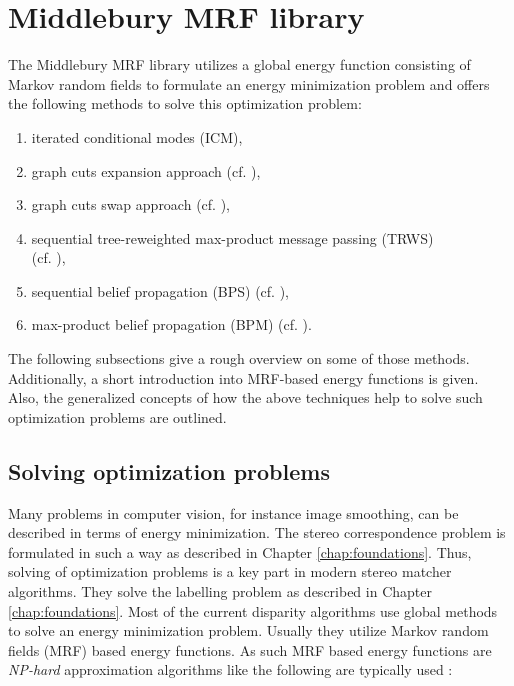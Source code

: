 \section{Middlebury MRF library}

The Middlebury MRF library \citep{scharstein2014high, szeliski2008comparative} utilizes a global energy function consisting of Markov random fields to formulate an energy minimization problem and offers the following methods to solve this optimization problem:

\begin{enumerate}
  \item iterated conditional modes (ICM),
  \item graph cuts expansion approach (cf. \citep{boykov2001fast, ramin2004energy, kolmogorov2004energy}),
  \item graph cuts swap approach (cf. \citep{boykov2001fast, ramin2004energy, kolmogorov2004energy}),
  \item sequential tree-reweighted max-product message passing (TRWS)\\(cf. \citep{kolmogorov2006convergent, wainwright2005map}),
  \item sequential belief propagation (BPS) (cf. \citep{boykov2001fast}),
  \item max-product belief propagation (BPM) (cf. \citep{boykov2001fast}).
\end{enumerate}

\noindent The following subsections give a rough overview on some of those methods.
Additionally, a short introduction into MRF-based energy functions is given.
Also, the generalized concepts of how the above techniques help to solve such optimization problems are outlined.

\subsection{Solving optimization problems}

Many problems in computer vision, for instance image smoothing, can be described in terms of energy minimization.
The stereo correspondence problem is formulated in such a way as described in Chapter \ref{chap:foundations}.
Thus, solving of optimization problems is a key part in modern stereo matcher algorithms.
They solve the labelling problem as described in Chapter \ref{chap:foundations}.
Most of the current disparity algorithms use global methods to solve an energy minimization problem.
Usually they utilize Markov random fields (MRF) based energy functions.
As such MRF based energy functions are \textit{NP-hard} approximation algorithms like the following are typically used \citep{tappen2003comparison, cyganek2011introduction}:

